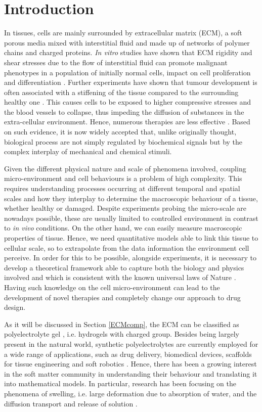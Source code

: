 \section{Introduction}

In tissues, cells are mainly surrounded by extracellular matrix (ECM), a soft porous media mixed with interstitial fluid and made up of networks of polymer chains and charged proteins. \textit{In vitro} studies have shown that ECM rigidity and shear stresses due to the flow of interstitial fluid can promote malignant phenotypes in a population of initially normal cells, impact on cell proliferation and differentiation \cite{ex3}. Further experiments have shown that tumour development is often associated with a stiffening of the tissue compared to the surrounding healthy one \cite{ex4}. This causes cells to be exposed to higher compressive stresses and the blood vessels to collapse, thus impeding the diffusion of substances in the extra-cellular environment. Hence, numerous therapies are less effective \cite{ecm2}. Based on such evidence, it is now widely accepted that, unlike originally thought, biological process are not simply regulated by biochemical signals but by the complex interplay of mechanical and chemical stimuli.
 
Given the different physical nature and scale of phenomena involved, coupling micro-environment and cell behaviours is a problem of high complexity. This requires understanding processes occurring at different temporal and spatial scales and how they interplay to determine the macroscopic behaviour of a tissue, whether healthy or damaged. Despite experiments probing the micro-scale are nowadays possible, these are usually limited to controlled environment in contrast to \textit{in vivo} conditions. On the other hand, we can easily measure macroscopic properties of tissue. Hence, we need quantitative models able to link this tissue to cellular scale, so to extrapolate from the data information the environment cell perceive. In order for this to be possible, alongside experiments, it is necessary to develop a theoretical framework able to capture both the biology and physics involved and which is consistent with the known universal laws of Nature \cite{NET}. Having such knowledge on the cell micro-environment can lead to the development of novel therapies and completely change our approach to drug design.  

As it will be discussed in Section \ref{ECMcomp}, the ECM can be classified as polyelectrolyte gel \cite{ecm1,ecm2}, i.e. hydrogels with charged group. Besides being largely present in the natural world, synthetic polyelectrolytes are currently employed for a wide range of applications, such as drug delivery, biomedical devices, scaffolds for tissue engineering and soft robotics \cite{hydroex3,hydroex2,hydroex1,hydroex4}. Hence, there has been a growing interest in the soft matter community in understanding their behaviour and translating it into mathematical models. In particular, research has been focusing on the phenomena of swelling, i.e. large deformation due to absorption of water, and the diffusion transport and release of solution \cite{DROZDOV+,DROZDOVph,Reviewpolyel,swell2}.

